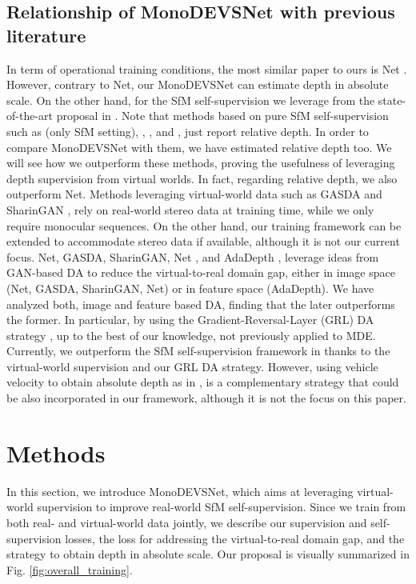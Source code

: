 \documentclass[journal]{IEEEtran}
\newcommand{\Fig}[1]{Fig. \ref{fig:#1}}
\begin{document}
\subsection{Relationship of MonoDEVSNet with previous literature} 
In term of operational training conditions, the most similar paper to ours is Net \cite{Cheng:2020S3Net}. However, contrary to Net, our MonoDEVSNet can estimate depth in absolute scale. On the other hand, for the SfM self-supervision we leverage from the state-of-the-art proposal in \cite{Godard:2019MonoDepth2}. Note that methods based on pure SfM self-supervision such as \cite{Godard:2019MonoDepth2} (only SfM setting), \cite{Zhou:2017}, \cite{Yin:2018GeoNet}, and \cite{Guizilini:2020semantic}, just report relative depth. In order to compare MonoDEVSNet with them, we have estimated relative depth too. We will see how we outperform these methods, proving the usefulness of leveraging depth supervision from virtual worlds. In fact, regarding relative depth, we also outperform Net. Methods leveraging virtual-world data such as GASDA \cite{Zhao:2019GASDA} and SharinGAN \cite{Pnvr:2020SharinGAN}, rely on real-world stereo data at training time, while we only require monocular sequences. On the other hand, our training framework can be extended to accommodate stereo data if available, although it is not our current focus. Net, GASDA, SharinGAN, Net \cite{Zheng:2018T2Net}, and AdaDepth \cite{Kundu:2018AdaDepth}, leverage ideas from GAN-based DA to reduce the virtual-to-real domain gap, either in image space (Net, GASDA, SharinGAN, Net) or in feature space (AdaDepth). We have analyzed both, image and feature based DA, finding that the later outperforms the former. In particular, by using the Gradient-Reversal-Layer (GRL) DA strategy \cite{Ganin:2015, Ganin:2016}, up to the best of our knowledge, not previously applied to MDE. Currently, we outperform the SfM self-supervision framework in \cite{Guizilini:20203D} thanks to the virtual-world supervision and our GRL DA strategy. However, using vehicle velocity to obtain absolute depth as in \cite{Guizilini:20203D}, is a complementary strategy that could be also incorporated in our framework, although it is not the focus on this paper.  

\section{Methods}
\label{sec:method}
In this section, we introduce MonoDEVSNet, which aims at leveraging virtual-world supervision to improve real-world SfM self-supervision. Since we train from both real- and virtual-world data jointly, we describe our supervision and self-supervision losses, the loss for addressing the virtual-to-real domain gap, and the strategy to obtain depth in absolute scale. Our proposal is visually summarized in \Fig{overall_training}.
\end{document}
